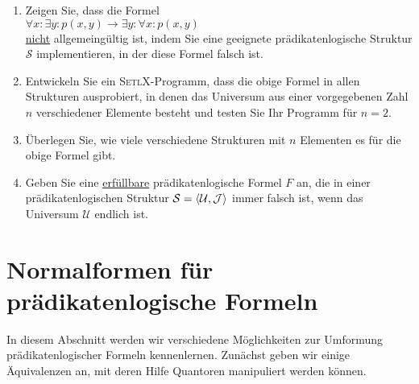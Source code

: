 \exercise
\begin{enumerate}
\item Zeigen Sie, dass die Formel
      \\[0.2cm]
      \hspace*{1.3cm}
      $\forall x: \exists y: p(x,y) \rightarrow \exists y: \forall x: p(x,y)$
      \\[0.2cm]
      \underline{nicht} allgemeing\"{u}ltig ist, indem Sie eine geeignete pr\"{a}dikatenlogische Struktur
      $\mathcal{S}$ implementieren, in der diese Formel falsch ist.
\item Entwickeln Sie ein \textsc{SetlX}-Programm, dass die obige Formel in allen Strukturen
      ausprobiert, in denen das Universum  aus einer vorgegebenen Zahl $n$ verschiedener Elemente
      besteht und testen Sie Ihr Programm f\"{u}r $n=2$.
\item \"{U}berlegen Sie, wie viele verschiedene Strukturen mit $n$ Elementen es f\"{u}r die obige Formel gibt.
\item Geben Sie eine \underline{erf\"{u}llbare} pr\"{a}dikatenlogische Formel $F$ an, die in einer pr\"{a}dikatenlogischen
      Struktur $\mathcal{S} = \pair(\mathcal{U},\mathcal{J})$ immer falsch ist, wenn das Universum
      $\mathcal{U}$ endlich ist.  \exend  
\end{enumerate}

\section{Normalformen f\"{u}r pr\"{a}dikatenlogische Formeln}
In diesem Abschnitt werden wir verschiedene M\"{o}glichkeiten zur Umformung pr\"{a}dikatenlogischer Formeln
kennenlernen.  Zun\"{a}chst geben wir einige \"{A}quivalenzen an, mit deren Hilfe Quantoren manipuliert werden k\"{o}nnen.

